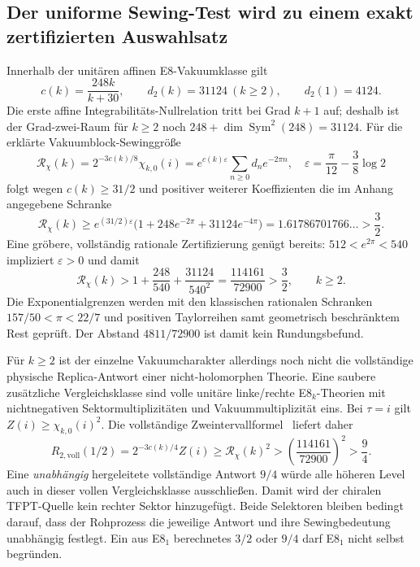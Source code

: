 \subsection{Der uniforme Sewing-Test wird zu einem exakt zertifizierten Auswahlsatz}
Innerhalb der unitären affinen E8-Vakuumklasse gilt
\begin{equation}
c(k)=\frac{248k}{k+30},\qquad
d_2(k)=31124\ (k\ge2),\qquad d_2(1)=4124.
\end{equation}
Die erste affine Integrabilitäts-Nullrelation tritt bei Grad $k+1$ auf; deshalb ist der Grad-zwei-Raum für $k\ge2$ noch
$248+\dim\operatorname{Sym}^2(248)=31124$.
Für die erklärte Vakuumblock-Sewinggröße
\begin{equation}
\mathcal R_\chi(k)=2^{-3c(k)/8}\chi_{k,0}(i)
=e^{c(k)\varepsilon}\sum_{n\ge0}d_n e^{-2\pi n},
\quad
\varepsilon=\frac{\pi}{12}-\frac38\log2
\end{equation}
folgt wegen $c(k)\ge31/2$ und positiver weiterer Koeffizienten die im Anhang angegebene Schranke
\begin{equation}
\mathcal R_\chi(k)\ge
e^{(31/2)\varepsilon}
\bigl(1+248e^{-2\pi}+31124e^{-4\pi}\bigr)
=1.61786701766\ldots>\frac32.
\end{equation}
Eine gröbere, vollständig rationale Zertifizierung genügt bereits:
$512<e^{2\pi}<540$ impliziert $\varepsilon>0$ und damit
\begin{equation}\label{eq:rationalsewing}
\boxed{\mathcal R_\chi(k)>
1+\frac{248}{540}+\frac{31124}{540^2}
=\frac{114161}{72900}
>\frac32,\qquad k\ge2.}
\end{equation}
Die Exponentialgrenzen werden mit den klassischen rationalen Schranken
$157/50<\pi<22/7$ und positiven Taylorreihen samt geometrisch beschränktem Rest geprüft. Der Abstand $4811/72900$ ist damit kein Rundungsbefund.

Für $k\ge2$ ist der einzelne Vakuumcharakter allerdings noch nicht die vollständige physische Replica-Antwort einer nicht-holomorphen Theorie.
Eine saubere zusätzliche Vergleichsklasse sind volle unitäre linke/rechte E8$_k$-Theorien mit nichtnegativen Sektormultiplizitäten und Vakuummultiplizität eins. Bei $\tau=i$ gilt
$Z(i)\ge\chi_{k,0}(i)^2$.
Die vollständige Zweintervallformel~\cite{headrickreplica} liefert daher
\begin{equation}
R_{2,\mathrm{voll}}(1/2)
=2^{-3c(k)/4}Z(i)
\ge\mathcal R_\chi(k)^2
>\left(\frac{114161}{72900}\right)^2
>\frac94.
\end{equation}
Eine \emph{unabhängig} hergeleitete vollständige Antwort $9/4$ würde alle höheren Level auch in dieser vollen Vergleichsklasse ausschließen. Damit wird der chiralen TFPT-Quelle kein rechter Sektor hinzugefügt. Beide Selektoren bleiben bedingt darauf, dass der Rohprozess die jeweilige Antwort und ihre Sewingbedeutung unabhängig festlegt. Ein aus E8$_1$ berechnetes $3/2$ oder $9/4$ darf E8$_1$ nicht selbst begründen.

